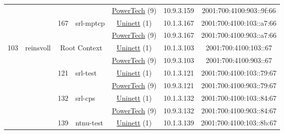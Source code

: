 \begin{small}
\begin{center}
\begin{longtable}{|c|c|c|c|c|c|c|c|}
  &  &  &  & \multicolumn{2}{|c|}{\tiny{\href{http://www.powertech.no}{PowerTech} (9)}} & \tiny{10.9.3.159} & \tiny{2001:700:4100:903::9f:66} \\* \cline{3-3}\cline{4-4}\cline{5-5}\cline{6-6}\cline{7-7}\cline{8-8}
  &  & \multirow{2}{*}{\tiny{167}} & \multicolumn{1}{|l|}{\multirow{2}{*}{\tiny{srl-mptcp}}} & \multicolumn{2}{|c|}{\tiny{\href{https://www.uninett.no}{Uninett} (1)}} & \tiny{10.1.3.167} & \tiny{2001:700:4100:103::a7:66} \\* \cline{5-5}\cline{6-6}\cline{7-7}\cline{8-8}
  &  &  &  & \multicolumn{2}{|c|}{\tiny{\href{http://www.powertech.no}{PowerTech} (9)}} & \tiny{10.9.3.167} & \tiny{2001:700:4100:903::a7:66} \\ \hline
 \multirow{18}{*}{\tiny{103}} & \multicolumn{1}{|l|}{\multirow{18}{*}{\tiny{reinsvoll}}} & \multicolumn{2}{|c|}{\multirow{2}{*}{\tiny{Root Context}}} & \multicolumn{2}{|c|}{\tiny{\href{https://www.uninett.no}{Uninett} (1)}} & \tiny{10.1.3.103} & \tiny{2001:700:4100:103::67} \\* \cline{5-5}\cline{6-6}\cline{7-7}\cline{8-8}
  &  & \multicolumn{2}{|c|}{} & \multicolumn{2}{|c|}{\tiny{\href{http://www.powertech.no}{PowerTech} (9)}} & \tiny{10.9.3.103} & \tiny{2001:700:4100:903::67} \\* \cline{3-3}\cline{4-4}\cline{5-5}\cline{6-6}\cline{7-7}\cline{8-8}
  &  & \multirow{2}{*}{\tiny{121}} & \multicolumn{1}{|l|}{\multirow{2}{*}{\tiny{srl-test}}} & \multicolumn{2}{|c|}{\tiny{\href{https://www.uninett.no}{Uninett} (1)}} & \tiny{10.1.3.121} & \tiny{2001:700:4100:103::79:67} \\* \cline{5-5}\cline{6-6}\cline{7-7}\cline{8-8}
  &  &  &  & \multicolumn{2}{|c|}{\tiny{\href{http://www.powertech.no}{PowerTech} (9)}} & \tiny{10.9.3.121} & \tiny{2001:700:4100:903::79:67} \\* \cline{3-3}\cline{4-4}\cline{5-5}\cline{6-6}\cline{7-7}\cline{8-8}
  &  & \multirow{2}{*}{\tiny{132}} & \multicolumn{1}{|l|}{\multirow{2}{*}{\tiny{srl-cps}}} & \multicolumn{2}{|c|}{\tiny{\href{https://www.uninett.no}{Uninett} (1)}} & \tiny{10.1.3.132} & \tiny{2001:700:4100:103::84:67} \\* \cline{5-5}\cline{6-6}\cline{7-7}\cline{8-8}
  &  &  &  & \multicolumn{2}{|c|}{\tiny{\href{http://www.powertech.no}{PowerTech} (9)}} & \tiny{10.9.3.132} & \tiny{2001:700:4100:903::84:67} \\* \cline{3-3}\cline{4-4}\cline{5-5}\cline{6-6}\cline{7-7}\cline{8-8}
  &  & \multirow{2}{*}{\tiny{139}} & \multicolumn{1}{|l|}{\multirow{2}{*}{\tiny{ntnu-test}}} & \multicolumn{2}{|c|}{\tiny{\href{https://www.uninett.no}{Uninett} (1)}} & \tiny{10.1.3.139} & \tiny{2001:700:4100:103::8b:67} \\* \cline{5-5}\cline{6-6}\cline{7-7}\cline{8-8}

\end{longtable}
\end{center}
\end{small}
